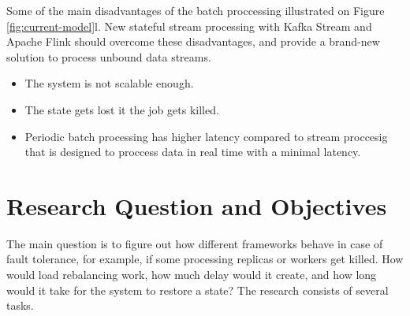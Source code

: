 %

Some of the main disadvantages of the batch proccessing illustrated on Figure \ref{fig:current-model}l.
New stateful stream processing with Kafka Stream and Apache Flink should overcome these disadvantages,
and provide a brand-new solution to process unbound data streams.

\begin{itemize}
    \item The system is not scalable enough.
    \item The state gets lost it the job gets killed.
    \item Periodic batch processing has higher latency compared to stream proccesig that is designed to
    proccess data in real time with a minimal latency.
\end{itemize}

\section{Research Question and Objectives}\label{sec:res-q-o}
The main question is to figure out how different frameworks behave in case of fault tolerance,
for example, if some processing replicas or workers get killed.
How would load rebalancing work, how much delay would it create,
and how long would it take for the system to restore a state?
The research consists of several tasks.


